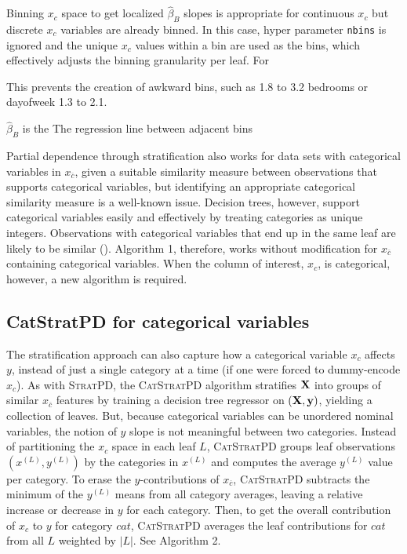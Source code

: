 \documentclass[12pt]{article}
\newcommand{\spd}{\fontfamily{cmr}\textsc{\small StratPD}}
\newcommand{\cspd}{\fontfamily{cmr}\textsc{\small CatStratPD}}
\newcommand{\xnc}{$x_{\overline{c}}$}
\begin{document}
Binning $x_c$ space to get localized $\hat{\beta}_B$ slopes is appropriate for continuous $x_c$ but discrete $x_c$ variables are already binned. In this case, hyper parameter {\tt nbins} is ignored and the unique $x_c$ values within a bin are used as the bins, which effectively adjusts the binning granularity per leaf. For

This prevents the creation of awkward bins, such as 1.8 to 3.2 bedrooms or dayofweek 1.3 to 2.1.

$\hat{\beta}_B$ is the The regression line between adjacent bins

Partial dependence through stratification also works for data sets with categorical variables in \xnc{}, given a suitable similarity measure between observations that supports categorical variables, but identifying an appropriate categorical similarity measure is a well-known issue.  Decision trees, however, support categorical variables easily and effectively by treating categories as unique integers. Observations with categorical variables that end up in the same leaf are likely to be similar (\cite{RFunsup}). Algorithm 1, therefore, works without modification for \xnc{} containing categorical variables. When the column of interest, $x_c$, is categorical, however, a new algorithm is required.

\subsection{CatStratPD for categorical variables}

The stratification approach can also capture how a categorical variable $x_c$ affects $y$, instead of just a single category at a time (if one were forced to dummy-encode $x_c$). As with \spd{}, the \cspd{} algorithm stratifies $\bf X$ into groups of similar \xnc{} features by training a decision tree regressor on $({\bf X}, {\bf y})$, yielding a collection of leaves. But, because categorical variables can be unordered nominal variables, the notion of $y$ slope is not meaningful between two categories. Instead of partitioning the $x_c$ space in each leaf $L$, \cspd{} groups leaf observations $(x^{(L)}, y^{(L)})$ by the categories in $x^{(L)}$ and computes the average $y^{(L)}$ value per category.  To erase the $y$-contributions of \xnc{}, \cspd{} subtracts the minimum of the $y^{(L)}$ means from all category averages, leaving a relative increase or decrease in $y$  for each category. Then, to get the overall contribution of $x_c$ to $y$ for category $cat$, \cspd{} averages the leaf contributions for $cat$ from all $L$ weighted by $|L|$. See Algorithm 2.
\end{document}
